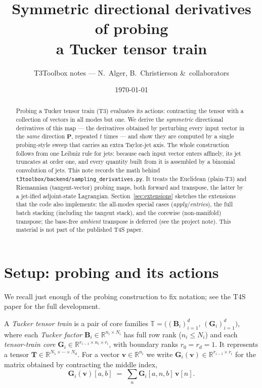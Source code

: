 \documentclass[11pt]{article}
\title{\bfseries Symmetric directional derivatives of probing\\ a Tucker tensor train}
\author{T3Toolbox notes --- N.\ Alger, B.\ Christierson \&\ collaborators}
\date{\today}
\newcommand{\R}{\mathbb{R}}
\theoremstyle{definition}
\theoremstyle{plain}
\begin{document}
\maketitle

\begin{abstract}
Probing a Tucker tensor train (T3) evaluates its actions: contracting the tensor with a
collection of vectors in all modes but one. We derive the \emph{symmetric} directional
derivatives of this map --- the derivatives obtained by perturbing every input vector in the
\emph{same} direction $\mathbf P$, repeated $t$ times --- and show they are computed by a single
probing-style sweep that carries an extra Taylor-jet axis. The whole construction follows from one
Leibniz rule for jets: because each input vector enters affinely, its jet truncates at order one,
and every quantity built from it is assembled by a binomial convolution of jets. This note records
the math behind \texttt{t3toolbox/backend/sampling\_derivatives.py}. It treats the Euclidean (plain-T3)
and Riemannian (tangent-vector) probing maps, both forward and transpose, the latter by a
jet-ified adjoint-state Lagrangian. Section~\ref{sec:extensions} sketches the extensions that the code
also implements: the all-modes special cases (\emph{apply}/\emph{entries}), the full batch stacking
(including the tangent stack), and the corewise (non-manifold) transpose; the base-free \emph{ambient}
transpose is deferred (see the project note). This material is not part of the published T4S paper.
\end{abstract}

\section{Setup: probing and its actions}
\label{sec:setup}

We recall just enough of the probing construction to fix notation; see the T4S paper for the full
development.

A \emph{Tucker tensor train} is a pair of core families $\mathbb T = \big((\mathbf B_i)_{i=1}^d,\,
(\mathbf G_i)_{i=1}^d\big)$, where each \emph{Tucker factor} $\mathbf B_i \in \R^{n_i \times N_i}$
has full row rank ($n_i \le N_i$) and each \emph{tensor-train core} $\mathbf G_i \in \R^{r_{i-1}
\times n_i \times r_i}$, with boundary ranks $r_0 = r_d = 1$. It represents a tensor $\mathbf T \in
\R^{N_1 \times \cdots \times N_d}$. For a vector $\mathbf v \in \R^{n_i}$ we write $\mathbf
G_i(\mathbf v) \in \R^{r_{i-1} \times r_i}$ for the matrix obtained by contracting the middle index,
\[
  \mathbf G_i(\mathbf v)[a,b] \;=\; \sum_{n} \mathbf G_i[a,n,b]\,\mathbf v[n].
\]
\end{document}
